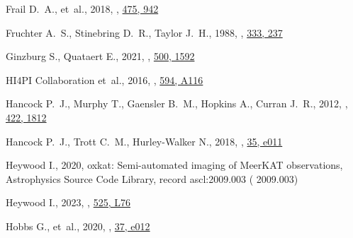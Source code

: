 \documentclass[fleqn,usenatbib]{mnras}
\begin{document}
\begin{thebibliography}{99}
{Frail} D.~A.,  et~al., 2018, , \href {https://ui.adsabs.harvard.edu/abs/2018MNRAS.475..942F} {475, 942}

{Fruchter} A.~S.,  {Stinebring} D.~R.,   {Taylor} J.~H.,  1988, , \href {https://ui.adsabs.harvard.edu/abs/1988Natur.333..237F} {333, 237}

{Ginzburg} S.,  {Quataert} E.,  2021, , \href {https://ui.adsabs.harvard.edu/abs/2021MNRAS.500.1592G} {500, 1592}

{HI4PI Collaboration} et~al., 2016, , \href {https://ui.adsabs.harvard.edu/abs/2016A&A...594A.116H} {594, A116}

{Hancock} P.~J.,  {Murphy} T.,  {Gaensler} B.~M.,  {Hopkins} A.,   {Curran} J.~R.,  2012, , \href {https://ui.adsabs.harvard.edu/abs/2012MNRAS.422.1812H} {422, 1812}

{Hancock} P.~J.,  {Trott} C.~M.,   {Hurley-Walker} N.,  2018, , \href {https://ui.adsabs.harvard.edu/abs/2018PASA...35...11H} {35, e011}

{Heywood} I.,  2020, {oxkat: Semi-automated imaging of MeerKAT observations}, Astrophysics Source Code Library, record ascl:2009.003 ( {2009.003})

{Heywood} I.,  2023, , \href {https://ui.adsabs.harvard.edu/abs/2023MNRAS.525L..76H} {525, L76}

{Hobbs} G.,  et~al., 2020, , \href {https://ui.adsabs.harvard.edu/abs/2020PASA...37...12H} {37, e012}


\end{thebibliography}
\end{document}
